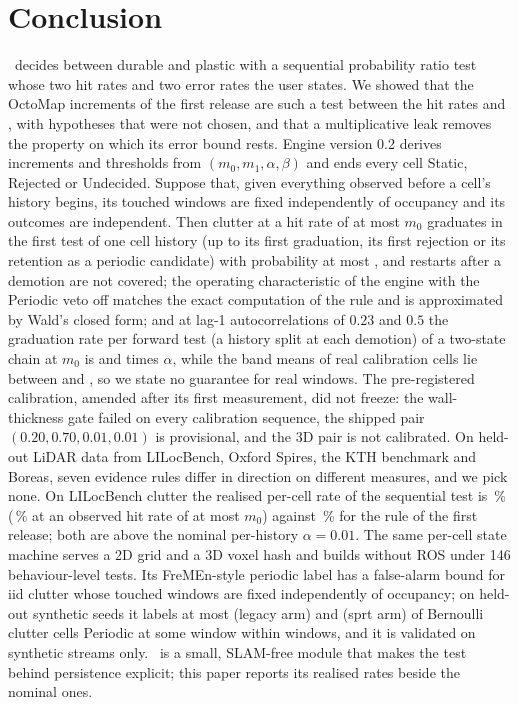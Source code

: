 \section{Conclusion}\label{sec:concl}

\sname\ decides between durable and plastic with a sequential probability ratio test whose two hit rates and two error rates the user states. We showed that the OctoMap increments of the first release are such a test between the hit rates \SqLegMzero{} and \SqLegMone{}, with hypotheses that were not chosen, and that a multiplicative leak removes the property on which its error bound rests. Engine version 0.2 derives increments and thresholds from $(m_0,m_1,\alpha,\beta)$ and ends every cell Static, Rejected or Undecided. Suppose that, given everything observed before a cell's history begins, its touched windows are fixed independently of occupancy and its outcomes are independent. Then clutter at a hit rate of at most $m_0$ graduates in the first test of one cell history (up to its first graduation, its first rejection or its retention as a periodic candidate) with probability at most \SqVille{}, and restarts after a demotion are not covered; the operating characteristic of the engine with the Periodic veto off matches the exact computation of the rule and is approximated by Wald's closed form; and at lag-1 autocorrelations of $0.23$ and $0.5$ the graduation rate per forward test (a history split at each demotion) of a two-state chain at $m_0$ is \SqAcTw{} and \SqAcHalf{} times $\alpha$, while the band means of real calibration cells lie between \CalLagLo{} and \CalLagHi{}, so we state no guarantee for real windows. The pre-registered calibration, amended after its first measurement, did not freeze: the wall-thickness gate failed on every calibration sequence, the shipped pair $(0.20,0.70,0.01,0.01)$ is provisional, and the 3D pair is not calibrated. On held-out LiDAR data from LILocBench, Oxford Spires, the KTH benchmark and Boreas, seven evidence rules differ in direction on different measures, and we pick none. On LILocBench clutter the realised per-cell rate of the sequential test is \PtLilAllSprt\,\% (\PtLilLeSprt\,\% at an observed hit rate of at most $m_0$) against \PtLilAllShipped\,\% for the rule of the first release; both are above the nominal per-history $\alpha=0.01$. The same per-cell state machine serves a 2D grid and a 3D voxel hash and builds without ROS under 146 behaviour-level tests. Its FreMEn-style periodic label has a false-alarm bound for iid clutter whose touched windows are fixed independently of occupancy; on held-out synthetic seeds it labels at most \SqEfiveLegWorst{} (legacy arm) and \SqEfiveWorst{} (sprt arm) of \SqCellsAperiodic{} Bernoulli clutter cells Periodic at some window within \SqEfiveHorizon{} windows, and it is validated on synthetic streams only. \sname\ is a small, SLAM-free module that makes the test behind persistence explicit; this paper reports its realised rates beside the nominal ones.
